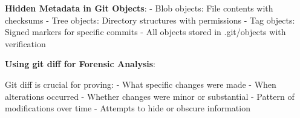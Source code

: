 \begin{Shaded}
\begin{Highlighting}[]
\OperatorTok{=}


  \AttributeTok{{-}{-}}

\OperatorTok{=} \OperatorTok{=}
\end{Highlighting}
\end{Shaded}

\textbf{Hidden Metadata in Git Objects}: - Blob objects: File contents
with checksums - Tree objects: Directory structures with permissions -
Tag objects: Signed markers for specific commits - All objects stored in
.git/objects with verification

\textbf{Using git diff for Forensic Analysis}:

\begin{Shaded}
\begin{Highlighting}[]




\end{Highlighting}
\end{Shaded}

Git diff is crucial for proving: - What specific changes were made -
When alterations occurred - Whether changes were minor or substantial -
Pattern of modifications over time - Attempts to hide or obscure
information

